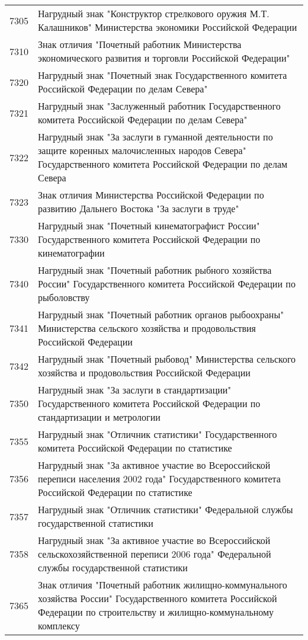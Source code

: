 \documentclass[10pt, a4paper, titlepage]{article}
\begin{document}
\begin{center}
\begin{longtable}{rp{}}
        7305 & Нагрудный знак "Конструктор стрелкового оружия М.Т. Калашников" Министерства экономики Российской Федерации \\
        7310 & Знак отличия "Почетный работник Министерства экономического развития и торговли Российской Федерации" \\
        7320 & Нагрудный знак "Почетный знак Государственного комитета Российской Федерации по делам Севера" \\
        7321 & Нагрудный знак "Заслуженный работник Государственного комитета Российской Федерации по делам Севера" \\
        7322 & Нагрудный знак "За заслуги в гуманной деятельности по защите коренных малочисленных народов Севера" Государственного комитета Российской Федерации по делам Севера \\
        7323 & Знак отличия Министерства Российской Федерации по развитию Дальнего Востока "За заслуги в труде" \\
        7330 & Нагрудный знак "Почетный кинематографист России" Государственного комитета Российской Федерации по кинематографии \\
        7340 & Нагрудный знак "Почетный работник рыбного хозяйства России" Государственного комитета Российской Федерации по рыболовству \\
        7341 & Нагрудный знак "Почетный работник органов рыбоохраны" Министерства сельского хозяйства и продовольствия Российской Федерации \\
        7342 & Нагрудный знак "Почетный рыбовод" Министерства сельского хозяйства и продовольствия Российской Федерации \\
        7350 & Нагрудный знак "За заслуги в стандартизации" Государственного комитета Российской Федерации по стандартизации и метрологии \\
        7355 & Нагрудный знак "Отличник статистики" Государственного комитета Российской Федерации по статистике \\
        7356 & Нагрудный знак "За активное участие во Всероссийской переписи населения 2002 года" Государственного комитета Российской Федерации по статистике \\
        7357 & Нагрудный знак "Отличник статистики" Федеральной службы государственной статистики \\
        7358 & Нагрудный знак "За активное участие во Всероссийской сельскохозяйственной переписи 2006 года" Федеральной службы государственной статистики \\
        7365 & Знак отличия "Почетный работник жилищно-коммунального хозяйства России" Государственного комитета Российской Федерации по строительству и жилищно-коммунальному комплексу \\

\end{longtable}
\end{center}
\end{document}
